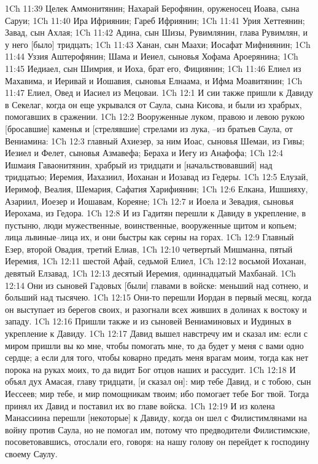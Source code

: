 1Ch 11:39  Целек Аммонитянин; Нахарай Берофянин, оруженосец Иоава, сына Саруи;
1Ch 11:40  Ира Ифриянин; Гареб Ифриянин;
1Ch 11:41  Урия Хеттеянин; Завад, сын Ахлая;
1Ch 11:42  Адина, сын Шизы, Рувимлянин, глава Рувимлян, и у него [было] тридцать;
1Ch 11:43  Ханан, сын Маахи; Иосафат Мифниянин;
1Ch 11:44  Уззия Аштерофянин; Шама и Иеиел, сыновья Хофама Ароерянина;
1Ch 11:45  Иедиаел, сын Шимрия, и Иоха, брат его, Фициянин;
1Ch 11:46  Елиел из Махавима, и Иеривай и Иошавия, сыновья Елнаама, и Ифма Моавитянин;
1Ch 11:47  Елиел, Овед и Иасиел из Мецоваи.
1Ch 12:1  И сии также пришли к Давиду в Секелаг, когда он еще укрывался от Саула, сына Кисова, и были из храбрых, помогавших в сражении.
1Ch 12:2  Вооруженные луком, правою и левою рукою [бросавшие] каменья и [стрелявшие] стрелами из лука, --из братьев Саула, от Вениамина:
1Ch 12:3  главный Ахиезер, за ним Иоас, сыновья Шемаи, из Гивы; Иезиел и Фелет, сыновья Азмавефа; Бераха и Иегу из Анафофа;
1Ch 12:4  Ишмаия Гаваонитянин, храбрый из тридцати и [начальствовавший] над тридцатью; Иеремия, Иахазиил, Иоханан и Иозавад из Гедеры.
1Ch 12:5  Елузай, Иеримоф, Веалия, Шемария, Сафатия Харифиянин;
1Ch 12:6  Елкана, Ишшияху, Азариил, Иоезер и Иошавам, Кореяне;
1Ch 12:7  и Иоела и Зевадия, сыновья Иерохама, из Гедора.
1Ch 12:8  И из Гадитян перешли к Давиду в укрепление, в пустыню, люди мужественные, воинственные, вооруженные щитом и копьем; лица львиные--лица их, и они быстры как серны на горах.
1Ch 12:9  Главный Езер, второй Овадия, третий Елиав,
1Ch 12:10  четвертый Мишманна, пятый Иеремия,
1Ch 12:11  шестой Афай, седьмой Елиел,
1Ch 12:12  восьмой Иоханан, девятый Елзавад,
1Ch 12:13  десятый Иеремия, одиннадцатый Махбанай.
1Ch 12:14  Они из сыновей Гадовых [были] главами в войске: меньший над сотнею, и больший над тысячею.
1Ch 12:15  Они-то перешли Иордан в первый месяц, когда он выступает из берегов своих, и разогнали всех живших в долинах к востоку и западу.
1Ch 12:16  Пришли также и из сыновей Вениаминовых и Иудиных в укрепление к Давиду.
1Ch 12:17  Давид вышел навстречу им и сказал им: если с миром пришли вы ко мне, чтобы помогать мне, то да будет у меня с вами одно сердце; а если для того, чтобы коварно предать меня врагам моим, тогда как нет порока на руках моих, то да видит Бог отцов наших и рассудит.
1Ch 12:18  И объял дух Амасая, главу тридцати, [и сказал он]: мир тебе Давид, и с тобою, сын Иессеев; мир тебе, и мир помощникам твоим; ибо помогает тебе Бог твой. Тогда принял их Давид и поставил их во главе войска.
1Ch 12:19  И из колена Манассиина перешли [некоторые] к Давиду, когда он шел с Филистимлянами на войну против Саула, но не помогал им, потому что предводители Филистимские, посоветовавшись, отослали его, говоря: на нашу голову он перейдет к господину своему Саулу.
